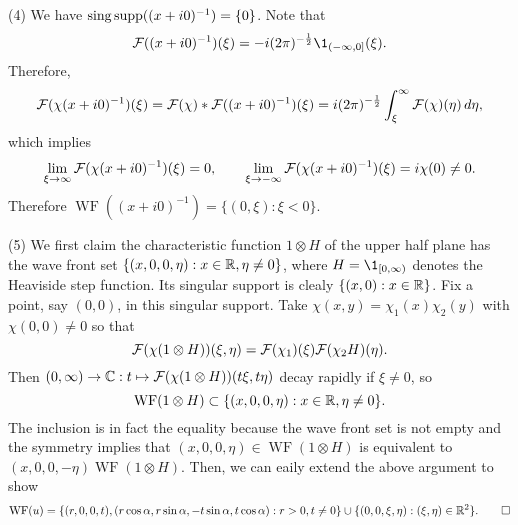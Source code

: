 \documentclass{../../../small}
\begin{document}
\begin{pf}[Solution of 4]
(4)
We have $\operatorname{sing}\operatorname{supp}((x+i0)^{-1})=\{0\}$.
Note that
\[\cF((x+i0)^{-1})(\xi)=-i(2\pi)^{-\frac12}\1_{(-\infty,0]}(\xi).\]
Therefore,
\[\mathcal{F}(\chi(x+i0)^{-1})(\xi)=\mathcal{F}(\chi)*\mathcal{F}((x+i0)^{-1})(\xi)=i(2\pi)^{-\frac12}\int_\xi^\infty\mathcal{F}(\chi)(\eta)\,d\eta,\]
which implies
\[\lim_{\xi\to\infty}\mathcal{F}(\chi(x+i0)^{-1})(\xi)=0,\qquad\lim_{\xi\to-\infty}\mathcal{F}(\chi(x+i0)^{-1})(\xi)=i\chi(0)\ne0.\]
Therefore $\operatorname{WF}((x+i0)^{-1})=\{(0,\xi):\xi<0\}$.

(5)
We first claim the characteristic function $1\otimes H$ of the upper half plane has the wave front set $\{(x,0,0,\eta):x\in\mathbb{R},\eta\ne0\}$, where $H=\1_{[0,\infty)}$ denotes the Heaviside step function.
Its singular support is clealy $\{(x,0):x\in\mathbb{R}\}$.
Fix a point, say $(0,0)$, in this singular support.
Take $\chi(x,y)=\chi_1(x)\chi_2(y)$ with $\chi(0,0)\ne0$ so that
\[\mathcal{F}(\chi(1\otimes H))(\xi,\eta)=\mathcal{F}(\chi_1)(\xi)\mathcal{F}(\chi_2 H)(\eta).\]
Then $(0,\infty)\to\mathbb{C}:t\mapsto\mathcal{F}(\chi(1\otimes H))(t\xi,t\eta)$ decay rapidly if $\xi\ne0$, so
\[\operatorname{WF}(1\otimes H)\subset\{(x,0,0,\eta):x\in\mathbb{R},\eta\ne0\}.\]
The inclusion is in fact the equality because the wave front set is not empty and the symmetry implies that $(x,0,0,\eta)\in\operatorname{WF}(1\otimes H)$ is equivalent to $(x,0,0,-\eta)\operatorname{WF}(1\otimes H)$.
Then, we can eaily extend the above argument to show
\[\operatorname{WF}(u)=\{(r,0,0,t),(r\cos\alpha,r\sin\alpha,-t\sin\alpha,t\cos\alpha):r>0,t\ne0\}\cup\{(0,0,\xi,\eta):(\xi,\eta)\in\mathbb{R}^2\}.\qedhere\]
\end{pf}
\end{document}
